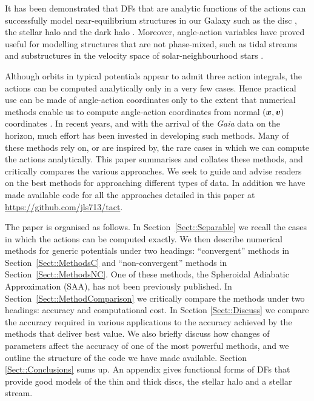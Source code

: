 \documentclass[useAMS,usenatbib,fleqn,a4paper]{mn2e}
\newcommand{\bs}[1]{\bmath{#1}}
\begin{document}
It has been demonstrated that DFs that are analytic functions of the actions
can successfully model near-equilibrium structures in our Galaxy such as the
disc \citep{Binney2010,Binney2012b,BovyRix2013,Piffl2014,SandersBinneyEDF},
the stellar halo \citep[][Das \& Binney, in prep.]{WilliamsEvans2015} and the dark halo
\citep{BinneyPiffl2015}.  Moreover, angle-action variables have proved useful for
modelling structures that are not phase-mixed, such as tidal streams
\citep{HelmiWhite1999,SandersBinney2013a,Bovy2014,Sanders2014} and
substructures in the velocity space of solar-neighbourhood stars
\citep{Sellwood2010,McMillan2011}.

Although orbits in typical potentials appear to admit three action integrals,
the actions can be computed analytically only in a very few cases. Hence
practical use can be made of angle-action coordinates only to the extent that
numerical methods enable us to compute angle-action coordinates from normal
$(\bs{x},\bs{v})$ coordinates . In recent years, and with the arrival of the
\emph{Gaia} data on the horizon, much effort has been invested in developing
such methods. Many of these methods rely on, or are inspired by, the rare
cases in which we can compute the actions analytically.  This paper
summarises and collates these methods, and critically compares the various
approaches.  We seek to guide and advise readers on the best methods for
approaching different types of data. In addition we have made available code
for all the approaches detailed in this paper at
\href{https://github.com/jls713/tact}{https://github.com/jls713/tact}.

The paper is organised as follows. In Section~\ref{Sect::Separable} we recall
the cases in which the actions can be computed exactly. We then describe
numerical methods for generic potentials under two headings: ``convergent''
methods in Section~\ref{Sect::MethodsC} and ``non-convergent'' methods in
Section~\ref{Sect::MethodsNC}. One of these methods, the Spheroidal Adiabatic
Approximation (SAA), has not been previously published. In
Section~\ref{Sect::MethodComparison} we critically compare the methods under
two headings: accuracy and computational cost. In Section \ref{Sect::Discuss}
we compare the accuracy required in various applications to the accuracy
achieved by the methods that deliver best value. We also
briefly discuss how changes of parameters affect the accuracy of one of the
most powerful methods, and we outline the structure of the code we have made
available. Section \ref{Sect::Conclusions} sums up. An appendix gives
functional forms of DFs that provide good models of the thin and thick discs, the stellar halo
and a stellar stream.
\end{document}
